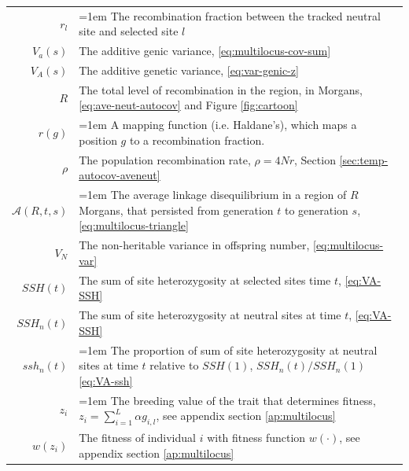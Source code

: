 \documentclass[11pt]{article}
\begin{document}
\begin{table}[!htbp]
\begin{tabular}{r|p{12cm}}
 $r_l$ & \hangindent=1em The recombination fraction between the tracked neutral site and selected site $l$\\
 $V_a(s)$ & The additive genic variance, \eqref{eq:multilocus-cov-sum} \\ 
 $V_A(s)$ & The additive genetic variance, \eqref{eq:var-genic-z} \\ 
 $R$ & The total level of recombination in the region, in Morgans, \eqref{eq:ave-neut-autocov} and Figure \ref{fig:cartoon} \\ 
 $r(g)$ & \hangindent=1em A mapping function (i.e. Haldane's), which maps a position $g$ to a recombination fraction.\\ 
 $\rho$ & The population recombination rate, $\rho = 4Nr$, Section \ref{sec:temp-autocov-aveneut} \\ 
 $\mathcal{A}(R, t, s)$ & \hangindent=1em The average linkage disequilibrium in a region of $R$ Morgans, that persisted from generation $t$ to generation $s$, \eqref{eq:multilocus-triangle} \\
 $V_N$ & The non-heritable variance in offspring number, \eqref{eq:multilocus-var} \\
 $SSH(t)$ & The sum of site heterozygosity at selected sites time $t$, \eqref{eq:VA-SSH} \\
 $SSH_n(t)$ & The sum of site heterozygosity at neutral sites at time $t$, \eqref{eq:VA-SSH} \\
 $ssh_n(t)$ & \hangindent=1em The proportion of sum of site heterozygosity at neutral sites at time $t$ relative to $SSH(1)$, $SSH_n(t) / SSH_n(1)$ \eqref{eq:VA-ssh} \\
 $z_i$ & \hangindent=1em The breeding value of the trait that determines fitness, $z_i = \sum_{i=1}^L \alpha g_{i,l}$, see appendix section \ref{ap:multilocus} \\
 $w(z_i)$ & The fitness of individual $i$ with fitness function $w(\cdot)$, see appendix section \ref{ap:multilocus} \\
\end{tabular}
 \label{ap:table-1}
\end{table}
\end{document}
